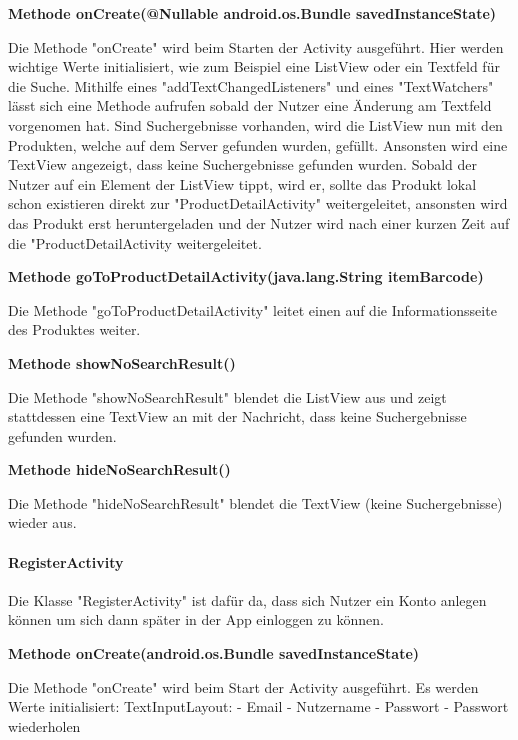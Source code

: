 \documentclass{scrartcl}
\begin{document}
\noindent\textbf{Methode onCreate(@Nullable android.os.Bundle savedInstanceState)}

\noindent Die Methode "onCreate" wird beim Starten der Activity ausgeführt. Hier werden wichtige Werte initialisiert, wie zum Beispiel eine ListView oder ein Textfeld für die Suche. Mithilfe eines "addTextChangedListeners" und eines "TextWatchers" lässt sich eine Methode aufrufen sobald der Nutzer eine Änderung am Textfeld vorgenomen hat. Sind Suchergebnisse vorhanden, wird die ListView nun mit den Produkten, welche auf dem Server gefunden wurden, gefüllt. Ansonsten wird eine TextView angezeigt, dass keine Suchergebnisse gefunden wurden. Sobald der Nutzer auf ein Element der ListView tippt, wird er, sollte das Produkt lokal schon existieren direkt zur "ProductDetailActivity" weitergeleitet, ansonsten wird das Produkt erst heruntergeladen und der Nutzer wird nach einer kurzen Zeit auf die "ProductDetailActivity weitergeleitet. \newline 

\noindent\textbf{Methode goToProductDetailActivity(java.lang.String itemBarcode)}
 
\noindent Die Methode "goToProductDetailActivity" leitet einen auf die Informationsseite des Produktes weiter. \newline

\noindent\textbf{Methode showNoSearchResult()}
 
\noindent Die Methode "showNoSearchResult" blendet die ListView aus und zeigt stattdessen eine TextView an mit der Nachricht, dass keine Suchergebnisse gefunden wurden. \newline 

\noindent\textbf{Methode hideNoSearchResult()}
 
\noindent Die Methode "hideNoSearchResult" blendet die TextView (keine Suchergebnisse) wieder aus. \newline 


\newpage

\paragraph{RegisterActivity}
Die Klasse "RegisterActivity" ist dafür da, dass sich Nutzer ein Konto anlegen können um sich dann später in der App einloggen zu können. \newline 

\noindent\textbf{Methode onCreate(android.os.Bundle savedInstanceState)}

\noindent Die Methode "onCreate" wird beim Start der Activity ausgeführt. Es werden Werte initialisiert: TextInputLayout: - Email - Nutzername - Passwort - Passwort wiederholen \newline 
\end{document}
